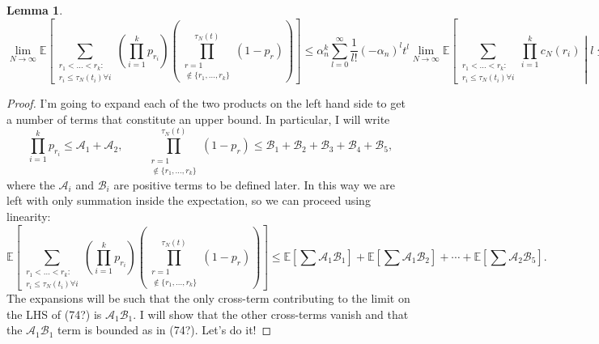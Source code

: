 \documentclass{article}
\newtheorem{lemma}{Lemma}
\newcommand{\E}{\mathbb{E}}
\newcommand{\1}[1]{\mathbbm{1}_{#1}}
\begin{document}
\begin{lemma}
\begin{equation}
\lim_{N\to\infty} \E \left[ \sum_{\substack{r_1 <\dots< r_k :\\ r_i \leq \tau_N(t_i) \forall i}}
\left( \prod_{i=1}^k p_{r_i} \right)
\left( \prod_{\substack{r=1 \\ \notin \{r_1,\dots,r_k\} }}^{\tau_N(t)} (1-p_r) \right) \right]
\leq \alpha_n^k \sum_{l=0}^\infty \frac{1}{l!} (-\alpha_n)^l t^l \lim_{N\to\infty} 
\E \left[ \sum_{\substack{r_1 <\dots< r_k :\\ r_i \leq \tau_N(t_i) \forall i}} \prod_{i=1}^k c_N(r_i) \middle| l \leq \tau_N(t) \right] 
\end{equation}
\end{lemma}

\begin{proof}
I'm going to expand each of the two products on the left hand side to get a number of terms that constitute an upper bound. In particular, I will write
\begin{equation}
\prod_{i=1}^k p_{r_i} \leq \mathscr{A}_1 + \mathscr{A}_2 , \qquad
\prod_{\substack{r=1 \\ \notin \{r_1,\dots,r_k\} }}^{\tau_N(t)} (1-p_r) \leq \mathscr{B}_1 + \mathscr{B}_2 + \mathscr{B}_3 + \mathscr{B}_4 + \mathscr{B}_5 ,
\end{equation}
where the $\mathscr{A}_i$ and $\mathscr{B}_i$ are positive terms to be defined later.
In this way we are left with only summation inside the expectation, so we can proceed using linearity:
\begin{equation}
\E \left[ \sum_{\substack{r_1 <\dots< r_k :\\ r_i \leq \tau_N(t_i) \forall i}}
\left( \prod_{i=1}^k p_{r_i} \right)
\left( \prod_{\substack{r=1 \\ \notin \{r_1,\dots,r_k\} }}^{\tau_N(t)} (1-p_r) \right) \right]
\leq
\E\left[ \sum \mathscr{A}_1 \mathscr{B}_1 \right] + \E\left[ \sum \mathscr{A}_1 \mathscr{B}_2 \right] + \cdots + \E\left[ \sum \mathscr{A}_2 \mathscr{B}_5 \right].
\end{equation}
The expansions will be such that the only cross-term contributing to the limit on the LHS of (74?) is $\mathscr{A}_1 \mathscr{B}_1$. I will show that the other cross-terms vanish and that the $\mathscr{A}_1 \mathscr{B}_1$ term is bounded as in (74?).
Let's do it!


\end{proof}
\end{document}
